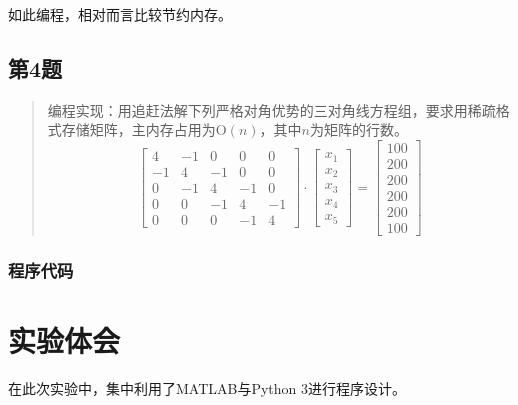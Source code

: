 \documentclass[UTF8, a4paper, zihao=-4, bibliography=totoc]{ctexart}
\begin{document}
如此编程，相对而言比较节约内存。

\subsection{第4题}
\begin{quote}
    {\kaishu
        编程实现：用追赶法解下列严格对角优势的三对角线方程组，要求用稀疏格式存储矩阵，主内存占用为$\mathrm{O}(n)$，其中$n$为矩阵的行数。
    }
    \begin{equation}
        \left[ \begin{array}{rrrrr}
            {4} & {-1} & {0} & {0} & {0} \\ {-1} & {4} & {-1} & {0} & {0} \\ {0} & {-1} & {4} & {-1} & {0} \\ {0} & {0} & {-1} & {4} & {-1} \\ {0} & {0} & {0} & {-1} & {4}\end{array}\right] \cdot \left[ \begin{array}{c}{x_{1}} \\ {x_{2}} \\ {x_{3}} \\ {x_{4}} \\ {x_{5}}\end{array}\right]=\left[ \begin{array}{c}{100} \\ {200} \\ {200} \\ {200} \\ {200} \\ {100}
        \end{array}\right]
    \end{equation}
\end{quote}



\subsubsection{程序代码}


\section{实验体会}

在此次实验中，集中利用了MATLAB与Python 3进行程序设计。
\end{document}

